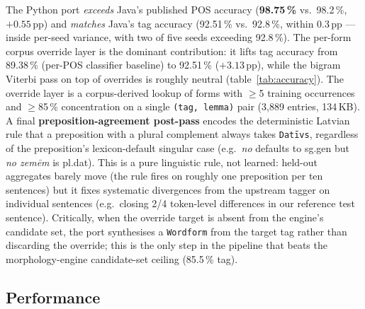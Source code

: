 \documentclass[11pt,a4paper]{article}
\begin{document}
The Python port \emph{exceeds} Java's published POS accuracy
(\textbf{98.75\,\%} vs.\ 98.2\,\%, $+0.55$\,pp) and \emph{matches} Java's
tag accuracy (92.51\,\% vs.\ 92.8\,\%, within 0.3\,pp --- inside per-seed
variance, with two of five seeds exceeding 92.8\,\%). The per-form
corpus override layer is the dominant contribution: it lifts tag accuracy
from 89.38\,\% (per-POS classifier baseline) to 92.51\,\% ($+3.13$\,pp),
while the bigram Viterbi pass on top of overrides is roughly neutral
(table~\ref{tab:accuracy}). The override layer is a corpus-derived lookup
of forms with $\geq$5 training occurrences and $\geq$85\,\% concentration
on a single \texttt{(tag, lemma)} pair (3{,}889 entries, 134\,KB).
A final \textbf{preposition-agreement post-pass} encodes the deterministic
Latvian rule that a preposition with a plural complement always takes
\texttt{Datīvs}, regardless of the preposition's lexicon-default singular
case (e.g.\ \emph{no} defaults to sg.gen but \emph{no zemēm} is pl.dat).
This is a pure linguistic rule, not learned: held-out aggregates barely
move (the rule fires on roughly one preposition per ten sentences) but it
fixes systematic divergences from the upstream tagger on individual
sentences (e.g.\ closing 2/4 token-level differences in our reference
test sentence).
Critically, when the override target is absent from the engine's
candidate set, the port synthesises a \texttt{Wordform} from the
target tag rather than discarding the override; this is the only step
in the pipeline that beats the morphology-engine candidate-set
ceiling (85.5\,\% tag).

\subsection{Performance}
\end{document}
